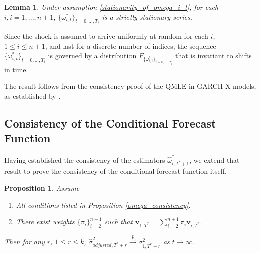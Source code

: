 \documentclass[11pt,3p,review,authoryear]{elsarticle}
\newcommand{\weight}{\pi}
\newtheorem{lem}{Lemma}
\newtheorem{prop}{Proposition}
\theoremstyle{definition}
\newenvironment{proof-of-proposition}[1][{}]{\noindent{\bf
    Proof of Proposition {#1}}
  \hspace*{.5em}}{\qed\bigskip\\}
\newenvironment{proof-of-lemma}[1][{}]{\noindent{\bf
Proof of Lemma {#1}}
\hspace*{.5em}}{\qed\bigskip\\}
\begin{document}
\begin{lem}
  Under assumption \ref{stationarity_of_omega_i_t}, for each $i, i=1,...,n+1$,  $\{\omega_{i,t}^{*}\}_{t=0,...,T_i}$ is a strictly stationary series.
\end{lem}

\begin{proof-of-lemma}
Since the shock is assumed to arrive uniformly at random for each $i$, $1 \leq i \leq n + 1$, and last for a discrete number of indices, the sequence $\{\omega_{i,t}^{*}\}_{t=0,...,T_i}$ is governed by a distribution $F_{\{\omega_{i,t}^{*}\}_{t=0,...,T_i}}$ that is invariant to shifts in time.
\end{proof-of-lemma}

\begin{proof-of-proposition}
The result follows from the consistency proof of the QMLE in GARCH-X models, as established by \citet{han2014asymptotic}. 
\end{proof-of-proposition}

\subsection{Consistency of the Conditional Forecast Function}

Having established the consistency of the estimators $\hat\omega^{*}_{i,T^{*}+1}$, we extend that result to prove the consistency of the conditional forecast function itself.

  \begin{prop}\label{sigma_consistency}
    Assume
    \begin{enumerate}
      \item All conditions listed in Proposition \ref{omega_consistency}.
      \item There exist weights $\{\pi_{i}\}_{i=2}^{n+1}$ such that $\textbf{v}_{1,T^{*}} = \sum^{n+1}_{i=2}\weight_{i} \textbf{v}_{i,T^{*}}$.
     \end{enumerate}
  Then for any $r$, $1\leq r \leq k$, $\hat\sigma^{2}_{adjusted,T^{*}+r}\overset{p}{\longrightarrow}\sigma^{2}_{1,T^{*}+r}$ as $t\rightarrow\infty$. 
  \end{prop}
\end{document}
